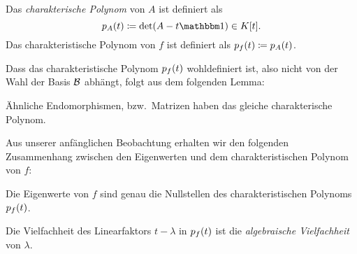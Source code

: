 \begin{definition}
  Das \emph{charakterische Polynom} von $A$ ist definiert als
  \[
              \charpol{A}(t)
    \coloneqq \det ( A - t \Id )
    \in       K[t].
  \]
  Das charakteristische Polynom von $f$ ist definiert als $p_{f}(t) \coloneqq p_{A}(t)$.
\end{definition}

Dass das charakteristische Polynom $p_{f}(t)$ wohldefiniert ist, also nicht von der Wahl der Basis $\mathcal{B}$ abhängt, folgt aus dem folgenden Lemma:

\begin{lemma}
  Ähnliche Endomorphismen, bzw.\ Matrizen haben das gleiche charakterische Polynom.
\end{lemma}

Aus unserer anfänglichen Beobachtung erhalten wir den folgenden Zusammenhang zwischen den Eigenwerten und dem charakteristischen Polynom von $f$:

\begin{proposition}
  Die Eigenwerte von $f$ sind genau die Nullstellen des charakteristischen Polynoms $p_{f}(t)$.
\end{proposition}

\begin{definition}
  Die Vielfachheit des Linearfaktors $t - \lambda$ in $p_{f}(t)$ ist die \emph{algebraische Vielfachheit} von $\lambda$.
\end{definition}

